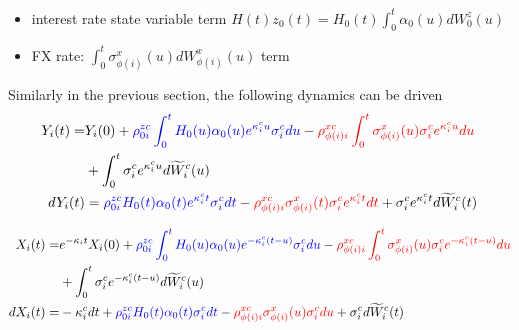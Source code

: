 \documentclass[]{article}
\begin{document}
\begin{itemize}
\item interest rate state variable term  $H(t) z_0(t)= H_0(t) \int_0^t\alpha_0(u)dW^z_{0}(u) $
\item FX rate: $\int_0^t \sigma^x_{\phi(i)}(u) dW^x_{\phi(i)}(u)$ term
\end{itemize}
Similarly in the previous section, the following dynamics can be driven 
%
\begin{align}
Y_i(t) =&Y_i(0)+ \textcolor{blue}{ \rho^{zc}_{0i } \int_{0}^t   H_0(u) \alpha_0(u) e^{\kappa^c_i u}  \sigma_i^c du }  
 -\textcolor{red}{ \rho^{xc}_{\phi(i)i}   \int_0^t  \sigma^x_{\phi(i)}(u) \sigma^c_i e^{\kappa^c_i u} du} \nonumber \\
&+ \int_0^t \sigma_i^c  e^{\kappa^c_i u} d\widetilde W_i^c(u)\nonumber \\
dY_i(t) &= \textcolor{blue}{ \rho^{zc}_{0i } H_0(t) \alpha_0(t) e^{\kappa^c_i t}  \sigma_i^c   dt} 
-\textcolor{red}{ \rho^{xc}_{\phi(i)i}   \sigma^x_{\phi(i)}(t) \sigma^c_i e^{\kappa^c_i t} dt}
+  \sigma_i^c  e^{\kappa^c_i t} d\widetilde W_i^c(t)\nonumber 
\end{align}

%
\begin{align}
X_i(t) =&  e^{-\kappa_i t}X_i(0) + \textcolor{blue}{ \rho^{zc}_{0i } \int_{0}^t   H_0(u) \alpha_0(u)e^{-\kappa^c_i (t-u)}  \sigma_i^c du}  
 -\textcolor{red}{ \rho^{xc}_{\phi(i)i}   \int_0^t  \sigma^x_{\phi(i)}(u) \sigma^c_i e^{-\kappa^c_i (t-u)} du}\nonumber \\
&+ \int_0^t \sigma_i^c  e^{-\kappa^c_i (t-u)} d\widetilde W_i^c(u)\nonumber \\
dX_i(t) =& -\kappa^c_i dt + \textcolor{blue}{ \rho^{zc}_{0i } H_0(t) \alpha_0(t) \sigma_i^c  dt }  
 -\textcolor{red}{ \rho^{xc}_{\phi(i)i}  \sigma^x_{\phi(i)}(u) \sigma^c_i du}
+  \sigma_i^c  d\widetilde W_i^c(t)\nonumber 
\end{align}
%
\end{document}
